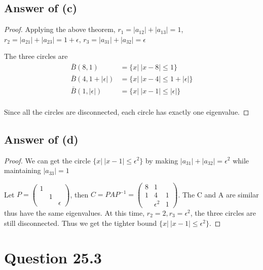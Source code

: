 \documentclass[letterpaper,11pt\iffalse ,draft\fi]{article}
\begin{document}
\subsection*{Answer of (c)}
\begin{proof}
Applying the above theorem, $r_1=|a_{12}|+|a_{13}|=1$, $r_2=|a_{21}|+|a_{23}|=1+\epsilon$, $r_3=|a_{31}|+|a_{32}|=\epsilon$

The three circles are $$\begin{aligned}
\bar{B}(8,1) &= \{x| \ |x-8|\leq 1\} \\
\bar{B}(4,1+|\epsilon|) &= \{x| \ |x-4|\leq 1+|\epsilon|\} \\
\bar{B}(1,|\epsilon|) &= \{x| \ |x-1|\leq |\epsilon|\} \\
\end{aligned}$$

Since all the circles are disconnected, each circle has exactly one eigenvalue.
\end{proof}


\subsection*{Answer of (d)}
\begin{proof}
We can get the circle $\{x| \ |x-1|\leq \epsilon^2\}$ by making $|a_{31}|+|a_{32}|=\epsilon^2$ while maintaining $|a_{33}|=1$

Let $P=\begin{pmatrix}
1 \\ & 1 \\ & & \epsilon
\end{pmatrix}$, then $C=PAP^{-1}=\begin{pmatrix}
8 & 1 \\ 1 & 4 & 1 \\  & \epsilon^2 & 1
\end{pmatrix}$. The C and A are similar thus have the same eigenvalues. At this time, $r_2=2, r_3=\epsilon^2$, the three circles are still disconnected. Thus we get the tighter bound $\{x| \ |x-1|\leq \epsilon^2\}$.
\end{proof}

\newpage

\section*{Question 25.3}
\end{document}
